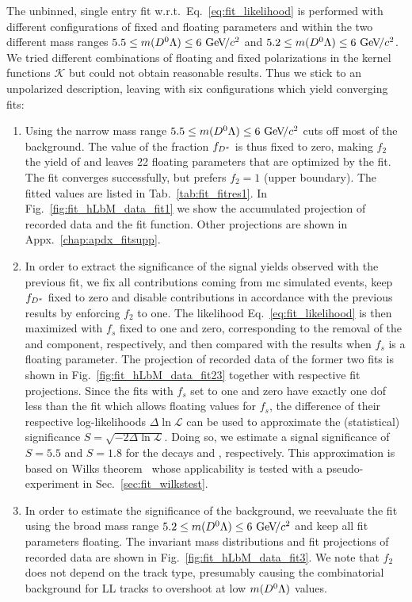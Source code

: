 The unbinned, single entry fit w.r.t.\ Eq.~\eqref{eq:fit_likelihood} is performed with different configurations of fixed and floating parameters and within the two different mass ranges $5.5 \le m({{D}^0}{\Lambda}) \le 6\,{\mathrm{\,Ge\kern -0.1em V\!/}c^2}$ and $5.2 \le m({{D}^0}{\Lambda}) \le 6\,{\mathrm{\,Ge\kern -0.1em V\!/}c^2}$.
We tried different combinations of floating and fixed polarizations in the \Dstar kernel functions $\mathcal{K}$ but could not obtain reasonable results.
Thus we stick to an unpolarized description, leaving with six configurations which yield converging fits:
\begin{enumerate}
    \item Using the narrow mass range $5.5 \le m({{D}^0}{\Lambda}) \le 6\,{\mathrm{\,Ge\kern -0.1em V\!/}c^2}$ cuts off most of the \decay{\Lb}{\Dstarz\Lz} background. The value of the fraction $f_{{D}^*}$ is thus fixed to zero, making $f_2$ the yield of \decay{\Xibz}{\Dstarz\Lz} and leaves 22 floating parameters that are optimized by the fit. The fit converges successfully, but prefers $f_2=1$ (upper boundary). The fitted values are listed in Tab.~\ref{tab:fit_fitres1}. In Fig.~\ref{fig:fit_hLbM_data_fit1} we show the accumulated projection of recorded data and the fit function. Other projections are shown in Appx.~\ref{chap:apdx_fitsupp}. 
    \item In order to extract the significance of the signal yields observed with the previous fit, we fix all contributions coming from \gls{mc} simulated events, keep $f_{{D}^*}$ fixed to zero and disable \Dstarz contributions in accordance with the previous results by enforcing $f_2$ to one. The likelihood Eq.~\eqref{eq:fit_likelihood} is then maximized with $f_s$ fixed to one and zero, corresponding to the removal of the \Xibz and \Lb component, respectively, and then compared with the results when $f_s$ is a floating parameter. The projection of recorded data of the former two fits is shown in Fig.~\ref{fig:fit_hLbM_data_fit23} together with respective fit projections. Since the fits with $f_s$ set to one and zero have exactly one \gls{dof} less than the fit which allows floating values for $f_s$, the difference of their respective log-likelihoods $\Delta \! \ln \mathcal{L}$ can be used to approximate the (statistical) significance $S = \sqrt{-2 \Delta \! \ln \mathcal{L}}$. Doing so, we estimate a signal significance of $S=5.5$ and $S=1.8$ for the decays \decay{\Lb}{\Dz\Lz} and \decay{\Xibz}{\Dz\Lz}, respectively. This approximation is based on Wilks theorem~\cite{wilkstheorem} whose applicability is tested with a pseudo-experiment in Sec.~\ref{sec:fit_wilkstest}.
    \item In order to estimate the significance of the \decay{\Lb}{\Dstarz\Lz} background, we reevaluate the fit using the broad mass range $5.2 \le m({{D}^0}{\Lambda}) \le 6\,{\mathrm{\,Ge\kern -0.1em V\!/}c^2}$ and keep all fit parameters floating. The invariant mass distributions and fit projections of recorded data are shown in Fig.~\ref{fig:fit_hLbM_data_fit3}. We note that $f_2$ does not depend on the track type, presumably causing the combinatorial background for \gls{LL} tracks to overshoot at low $m({{D}^0}{\Lambda})$ values.

\end{enumerate}
